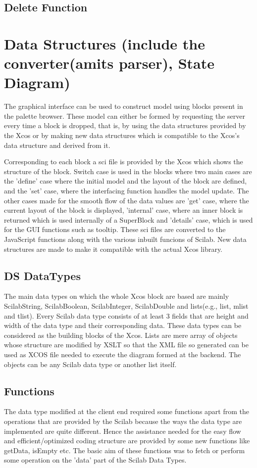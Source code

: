 \documentclass[conference]{IEEEtran}
\begin{document}
\subsection{Delete Function}


\section{Data Structures (include the converter(amits parser), State Diagram)}
The graphical interface can be used to construct model using blocks present in the palette browser. These model can either be formed by requesting the server every time a block is dropped, that is, by using the data structures provided by the Xcos or by making new data structures which is compatible to the Xcos's data structure and derived from it.

Corresponding to each block a sci file is provided by the Xcos which shows the structure of the block. Switch case is used in the blocks where two main cases are the 'define' case where the initial model and the layout of the block are defined, and the 'set' case, where the interfacing function handles the model update. The other cases made for the smooth flow of the data values are 'get' case, where the current layout of the block is displayed, 'internal' case, where an inner block is returned which is used internally of a SuperBlock and 'details' case, which is used for the GUI functions such as tooltip. These sci files are converted to the JavaScript functions along with the various inbuilt funcions of Scilab. New data structures are made to make it compatible with the actual Xcos library.


\subsection{DS DataTypes}
The main data types on which the whole Xcos block are based are mainly ScilabString, ScilabBoolean, ScilabInteger, ScilabDouble and lists(e.g., list, mlist and tlist). Every Scilab data type consists of at least 3 fields that are height and width of the data type and their corresponding data.
These data types can be considered as the building blocks of the Xcos. Lists are mere array of objects whose structure are modified by XSLT so that the XML file so generated can be used as XCOS file needed to execute the diagram formed at the backend. The objects can be any Scilab data type or another list itself.

\subsection{Functions}
The data type modified at the client end required some functions apart from the operations that are provided by the Scilab because the ways the data type are implemented are quite different. Hence the assistance needed for the easy flow and efficient/optimized coding structure are provided by some new functions like getData, isEmpty etc. The basic aim of these functions was to fetch or perform some operation on the 'data' part of the Scilab Data Types.
\end{document}

